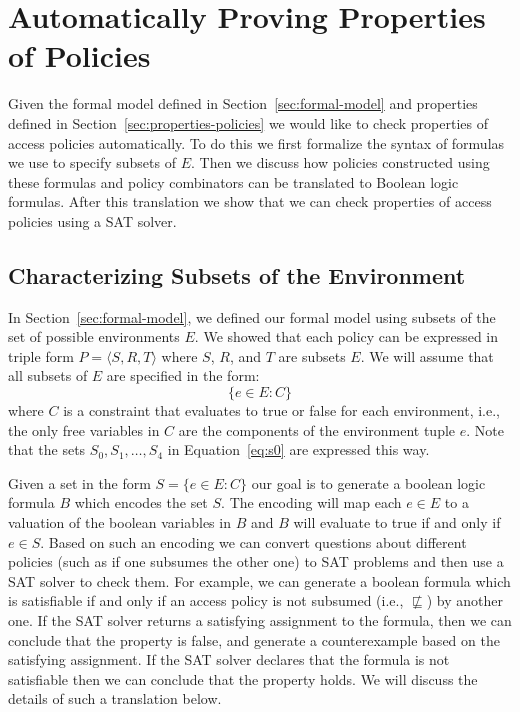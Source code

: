 
\def \Union {\bigcup}
\def \union {\cup}
\def \Intersect {\bigcap}
\def \intersect {\cap}
\def \And {\wedge}
\def \Or {\vee}
\def \band {\bigwedge}
\def \bor {\bigvee}
\def \Implies {\Rightarrow}
\def \Iff {\Leftrightarrow}
\def \implies {\rightarrow}
\def \iff {\leftrightarrow}
\def \true {\texttt{true}}
\def \false {\texttt{false}}
\def \assign {:=}

\section{Automatically Proving Properties of Policies}
\label{sec:autom-prov-prop}

Given the formal model defined in Section~\ref{sec:formal-model} and
properties defined in Section~\ref{sec:properties-policies} we would
like to check properties of access policies automatically.  To do this
we first formalize the syntax of formulas we use to specify subsets of
$E$.  Then we discuss how policies constructed using these formulas
and policy combinators can be translated to Boolean logic formulas.  
After this translation we show that we can 
check properties of access policies using a SAT solver.

\subsection{Characterizing Subsets of the Environment}
\label{sec:policy-classes}

In Section~\ref{sec:formal-model}, we defined our formal model using
subsets of the set of possible environments $E$. 
We showed that each policy can be expressed
in triple form $P= \langle S, R, T \rangle$   where
$S$, $R$, and $T$ are subsets $E$.
We will assume that all subsets of $E$ are specified in the form:
\[ 
\{ e \in E : C \}
\]
where $C$ is a constraint that evaluates to true or
false for each environment, i.e., the only free variables
in $C$ are the components of the environment tuple $e$.
Note that the sets $S_0, S_1, \dots, S_4$ in
Equation~\eqref{eq:s0} are expressed this way.

Given a set in the form $S = \{ e \in E : C \}$
our goal is to generate a boolean logic formula
$B$ which encodes the set $S$.  The encoding will map each $e \in E$
to a valuation of the boolean variables in $B$ and $B$ will evaluate
to true if and only if $e \in S$.  Based on such an encoding we can
convert questions about different policies (such as if one subsumes
the other one) to SAT problems and then use a SAT solver to check
them.  For example, we can generate a boolean formula which is
satisfiable if and only if an access policy is not subsumed (i.e.,
$\not \sqsubseteq$) by another one.  If the SAT solver returns a satisfying
assignment to the formula, then we can conclude that the property is
false, and generate a counterexample based on the satisfying
assignment.  If the SAT solver declares that the formula is not
satisfiable then we can conclude that the property holds.
We will discuss the details of such a translation below.

